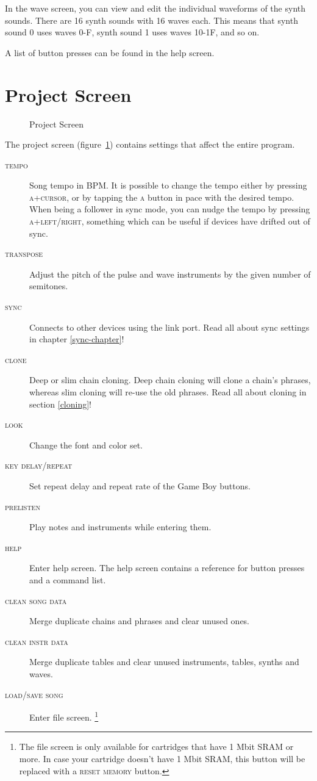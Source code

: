 In the wave screen, you can view and edit the individual waveforms of the synth sounds. There are 16 synth sounds with 16 waves each. This means that synth sound 0 uses waves 0-F, synth sound 1 uses waves 10-1F, and so on.

A list of button presses can be found in the help screen.

\section{Project Screen}

\begin{figure}[htpb]
	\begin{center}
	\end{center}
	\caption{Project Screen}
	\label{fig:project}
\end{figure}

The project screen (figure~\ref{fig:project}) contains settings that affect the entire program.

\begin{description}
	\item[\textsc{tempo}] Song tempo in BPM. It is possible to change the tempo either by pressing
\textsc{a+cursor}, or by tapping the \textsc{a} button in pace with the desired tempo. When being a
follower in sync mode, you can nudge the tempo by pressing \textsc{a+left/right}, something which
can be useful if devices have drifted out of sync.
	\item[\textsc{transpose}] Adjust the pitch of the pulse and wave instruments by the given number of semitones.
	\item[\textsc{sync}] Connects to other devices using the link port. Read all about sync settings in chapter \ref{sync-chapter}!

	\item[\textsc{clone}] Deep or slim chain cloning. Deep chain cloning will clone a chain's phrases, whereas slim cloning will re-use the old phrases. Read all about cloning in section \ref{cloning}!
	\item[\textsc{look}] Change the font and color set.
	\item[\textsc{key delay/repeat}] Set repeat delay and repeat rate of the Game Boy buttons.
	\item[\textsc{prelisten}] Play notes and instruments while entering them.

	\item[\textsc{help}] Enter help screen. The help screen contains a reference for button presses and a command list.
	\item[\textsc{clean song data}] Merge duplicate chains and phrases and clear unused ones. \label{clean-song-data}
	\item[\textsc{clean instr data}] Merge duplicate tables and clear unused instruments, tables, synths and waves.
	\item[\textsc{load/save song}] Enter file screen. \footnote{The file screen is only available for cartridges that have 1 Mbit SRAM or more. In case your cartridge doesn't have 1 Mbit SRAM, this button will be replaced with a \textsc{reset memory} button.}
\end{description}

